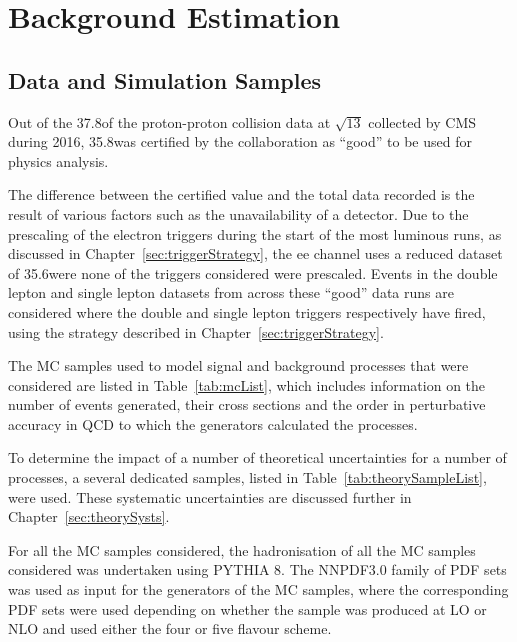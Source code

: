 \chapter{Background Estimation}\label{chapter:bkg}
%
%
%
%

\section{Data and Simulation Samples}\label{sec:samples}
Out of the 37.8\fbinv of the proton-proton collision data at $\sqrt{13}$ collected by CMS during 2016, 35.8\fbinv was certified by the collaboration as ``good'' to be used for physics analysis.

The difference between the certified value and the total data recorded is the result of various factors such as the unavailability of a detector.
Due to the prescaling of the electron triggers during the start of the most luminous runs, as discussed in Chapter~\ref{sec:triggerStrategy}, the ee channel uses a reduced dataset of 35.6\fbinv were none of the triggers considered were prescaled.
Events in the double lepton and single lepton datasets from across these ``good'' data runs are considered where the double and single lepton triggers respectively have fired, using the strategy described in Chapter~\ref{sec:triggerStrategy}.

The MC samples used to model signal and background processes that were considered are listed in Table~\ref{tab:mcList}, which includes information on the number of events generated, their cross sections and the order in perturbative accuracy in QCD to which the generators calculated the processes.

To determine the impact of a number of theoretical uncertainties for a number of processes, a several dedicated samples, listed in Table~\ref{tab:theorySampleList}, were used.
These systematic uncertainties are discussed further in Chapter~\ref{sec:theorySysts}.

For all the MC samples considered, the hadronisation of all the MC samples considered was undertaken using PYTHIA 8.
The NNPDF3.0 family of PDF sets was used as input for the generators of the MC samples, where the corresponding PDF sets were used depending on whether the sample was produced at LO or NLO and used either the four or five flavour scheme.

